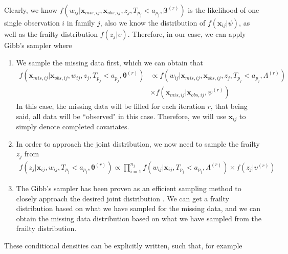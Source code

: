 \documentclass[preprint,12pt]{elsarticle}
\begin{document}
Clearly, we know $f(w_{ij}|\mathbf{x}_{mis,ij}, \mathbf{x}_{obs,ij}, z_j, T_{p_j}<a_{p_j}, \boldsymbol{\beta}^{(r)})$ is the likelihood of one single observation $i$ in family $j$, also we know the distribution of $f(\mathbf{x}_{ij}|\psi)$, as well as the frailty distribution $f(z_j|\upsilon)$. 
Therefore, in our case, we can apply Gibb's sampler where 

\begin{enumerate} 
    \item We sample the missing data first, which we can obtain that 
    \begin{align} 
        f(\mathbf{x}_{mis,ij}|\mathbf{x}_{obs,ij}, w_{ij}, z_j, T_{p_j}<a_{p_j}, \boldsymbol{\theta}^{(r)})&\propto f(w_{ij}|\boldsymbol{x}_{mis,ij}, \boldsymbol{x}_{obs,ij}, z_j, T_{p_j}<a_{p_j}, \Lambda^{(r)})\\
        &\times f(\mathbf{x}_{mis,ij}|\mathbf{x}_{obs,ij},\psi^{(r)})
    \end{align}
    In this case, the missing data will be filled for each iteration $r$, that being said, all data will be ``observed" in this case. 
    Therefore, we will use $\mathbf{x}_{ij}$ to simply denote completed covariates. 
    \item In order to approach the joint distribution, we now need to sample the frailty $z_j$ from 
    \begin{align} 
        f(z_j|\mathbf{x}_{ij}, w_{ij}, T_{p_j}<a_{p_j}, \boldsymbol{\theta}^{(r)})\propto \prod_{i=1}^{n_j}f(w_{ij}|\mathbf{x}_{ij}, T_{p_j}<a_{p_j}, \Lambda^{(r)})\times f(z_j|\upsilon^{(r)})
    \end{align}
    \item The Gibb's sampler has been proven as an efficient sampling method to closely approach the desired joint distribution \cite{gelfand1990sampling}. 
    We can get a frailty distribution based on what we have sampled for the missing data, and we can obtain the missing data distribution based on what we have sampled from the frailty distribution. 
\end{enumerate}
These conditional densities can be explicitly written, such that, for example
\end{document}
